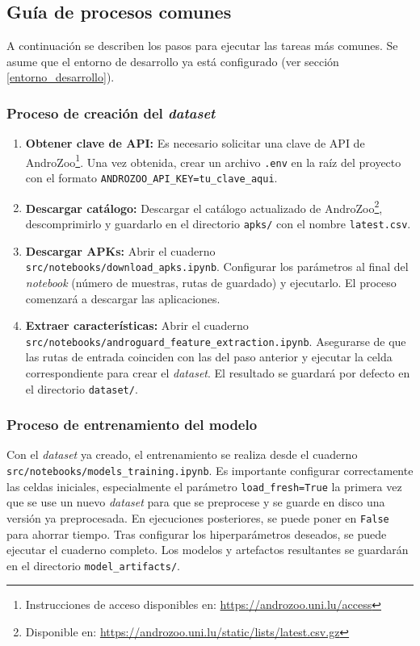\subsection{Guía de procesos comunes} \label{procesos_comunes}
A continuación se describen los pasos para ejecutar las tareas más comunes. Se asume que el entorno de desarrollo ya está configurado (ver sección \ref{entorno_desarrollo}).

\subsubsection{Proceso de creación del \textit{dataset}}
\begin{enumerate}
	\item \textbf{Obtener clave de API:} Es necesario solicitar una clave de API de AndroZoo\footnote{Instrucciones de acceso disponibles en: \url{https://androzoo.uni.lu/access}}. Una vez obtenida, crear un archivo \texttt{.env} en la raíz del proyecto con el formato \texttt{ANDROZOO\_API\_KEY=tu\_clave\_aqui}.
	
	\item \textbf{Descargar catálogo:} Descargar el catálogo actualizado de AndroZoo\footnote{Disponible en: \url{https://androzoo.uni.lu/static/lists/latest.csv.gz}}, descomprimirlo y guardarlo en el directorio \texttt{apks/} con el nombre \texttt{latest.csv}.
	
	\item \textbf{Descargar APKs:} Abrir el cuaderno \\\texttt{src/notebooks/download\_apks.ipynb}. Configurar los parámetros al final del \textit{notebook} (número de muestras, rutas de guardado) y ejecutarlo. El proceso comenzará a descargar las aplicaciones.
	
	\item \textbf{Extraer características:} Abrir el cuaderno \\\texttt{src/notebooks/androguard\_feature\_extraction.ipynb}. Asegurarse de que las rutas de entrada coinciden con las del paso anterior y ejecutar la celda correspondiente para crear el \textit{dataset}. El resultado se guardará por defecto en el directorio \texttt{dataset/}.
\end{enumerate}

\subsubsection{Proceso de entrenamiento del modelo}
Con el \textit{dataset} ya creado, el entrenamiento se realiza desde el cuaderno \texttt{src/notebooks/models\_training.ipynb}. Es importante configurar correctamente las celdas iniciales, especialmente el parámetro \texttt{load\_fresh=True} la primera vez que se use un nuevo \textit{dataset} para que se preprocese y se guarde en disco una versión ya preprocesada. En ejecuciones posteriores, se puede poner en \texttt{False} para ahorrar tiempo. Tras configurar los hiperparámetros deseados, se puede ejecutar el cuaderno completo. Los modelos y artefactos resultantes se guardarán en el directorio \texttt{model\_artifacts/}.

